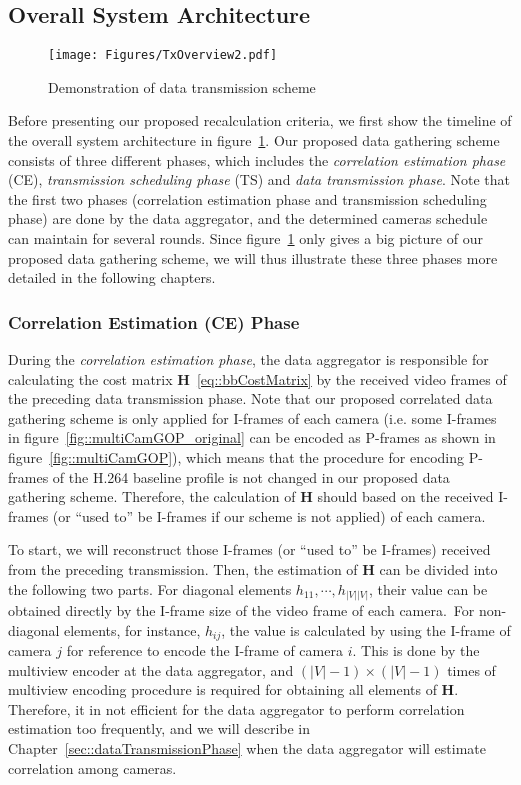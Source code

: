 {\subsection{Overall System Architecture}
\label{sec::overallSystemArchi}
%
\begin{figure}
\begin{center}
\texttt{[image: Figures/TxOverview2.pdf]}
\caption{\label{fig::txOverview}Demonstration of data transmission scheme}
\end{center}
\end{figure}
%
Before presenting our proposed recalculation criteria, we first show the timeline of the overall system architecture in figure~\ref{fig::txOverview}.
Our proposed data gathering scheme consists of three different phases, which includes the \emph{correlation estimation phase} (CE), \emph{transmission scheduling phase} (TS) and \emph{data transmission phase}.
Note that the first two phases (correlation estimation phase and transmission scheduling phase) are done by the data aggregator, and the determined cameras schedule can maintain for several rounds.
Since figure~\ref{fig::txOverview} only gives a big picture of our proposed data gathering scheme, we will thus illustrate these three phases more detailed in the following chapters. 
%
\subsubsection{Correlation Estimation (CE) Phase}
During the \emph{correlation estimation phase}, the data aggregator is responsible for calculating the cost matrix $\mathbf{H}$~\eqref{eq::bbCostMatrix} by the received video frames of the preceding data transmission phase.
Note that our proposed correlated data gathering scheme is only applied for I-frames of each camera (i.e. some I-frames in figure~\ref{fig::multiCamGOP_original} can be encoded as P-frames as shown in figure~\ref{fig::multiCamGOP}), which means that the procedure for encoding P-frames of the H.264 baseline profile is not changed in our proposed data gathering scheme.
Therefore, the calculation of $\mathbf{H}$ should based on the received I-frames (or ``used to'' be I-frames if our scheme is not applied) of each camera.

To start, we will reconstruct those I-frames (or ``used to'' be I-frames) received from the preceding transmission.
Then, the estimation of $\mathbf{H}$ can be divided into the following two parts.
For diagonal elements $h_{11},\cdots,h_{|V||V|}$, their value can be obtained directly by the I-frame size of the video frame of each camera.\
For non-diagonal elements, for instance, $h_{ij}$, the value is calculated by using the I-frame of camera $j$ for reference to encode the I-frame of camera $i$.
This is done by the multiview encoder at the data aggregator, and ${(|V|-1) \times (|V|-1)}$ times of multiview encoding procedure is required for obtaining all elements of $\mathbf{H}$.
Therefore, it in not efficient for the data aggregator to perform correlation estimation too frequently, and we will describe in Chapter~\ref{sec::dataTransmissionPhase} when the data aggregator will estimate correlation among cameras.
%
}
